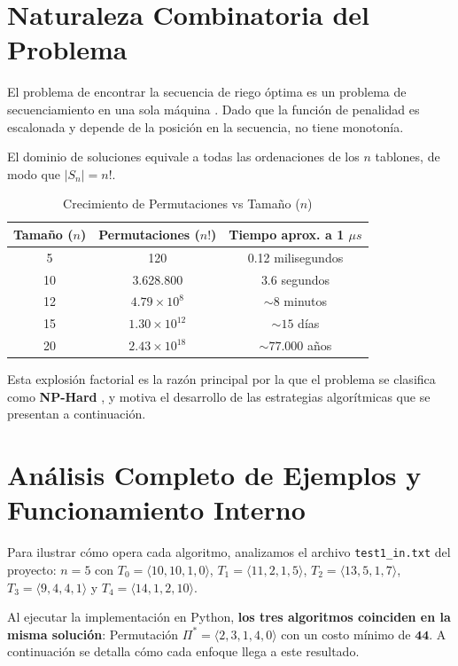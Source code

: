 \documentclass[conference, a4paper]{IEEEtran}
\begin{document}
\section{Naturaleza Combinatoria del Problema}
El problema de encontrar la secuencia de riego óptima es un problema de secuenciamiento en una sola máquina \cite{graham1979optimization, pinedo2016scheduling}. Dado que la función de penalidad es escalonada y depende de la posición en la secuencia, no tiene monotonía.

El dominio de soluciones equivale a todas las ordenaciones de los $n$ tablones, de modo que $|S_n| = n!$.

\begin{table}[htbp]
\centering
\caption{Crecimiento de Permutaciones vs Tamaño ($n$)}
\begin{tabular}{@{}c c c@{}}
\toprule
\textbf{Tamaño ($n$)} & \textbf{Permutaciones ($n!$)} & \textbf{Tiempo aprox. a 1 $\mu s$} \\ \midrule
5 & 120 & 0.12 milisegundos \\
10 & 3.628.800 & 3.6 segundos \\
12 & $4.79 \times 10^8$ & $\sim 8$ minutos \\
15 & $1.30 \times 10^{12}$ & $\sim 15$ días \\
20 & $2.43 \times 10^{18}$ & $\sim 77.000$ años \\ \bottomrule
\end{tabular}
\end{table}

Esta explosión factorial es la razón principal por la que el problema se clasifica como \textbf{NP-Hard} \cite{cormen2009introduction}, y motiva el desarrollo de las estrategias algorítmicas que se presentan a continuación.

\section{Análisis Completo de Ejemplos y Funcionamiento Interno}
Para ilustrar cómo opera cada algoritmo, analizamos el archivo \texttt{test1\_in.txt} del proyecto: 
$n=5$ con $T_0=\langle 10, 10, 1, 0 \rangle$, $T_1=\langle 11, 2, 1, 5 \rangle$, $T_2=\langle 13, 5, 1, 7 \rangle$, $T_3=\langle 9, 4, 4, 1 \rangle$ y $T_4=\langle 14, 1, 2, 10 \rangle$.

Al ejecutar la implementación en Python, \textbf{los tres algoritmos coinciden en la misma solución}:
Permutación $\Pi^* = \langle 2, 3, 1, 4, 0 \rangle$ con un costo mínimo de $\mathbf{44}$.
A continuación se detalla cómo cada enfoque llega a este resultado.
\end{document}
